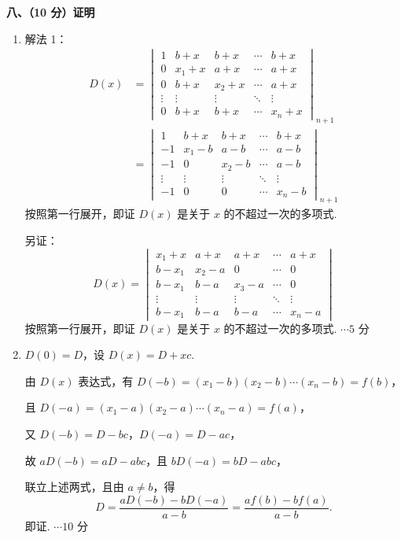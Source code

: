 \documentclass[a4paper,11pt]{ctexart}
\newcommand{\score}[1]{\hfill$\cdots\text{#1 分}$}
\begin{document}
\vspace{1.0em}

\textbf{八、（10 分）证明}

\begin{enumerate}[label=(\arabic*), leftmargin=2.4em, itemsep=0.35em, topsep=0.3em]
  \item 解法 1：
  \begin{align*}
    D(x) &= \begin{vmatrix}
      1 & b+x & b+x & \cdots & b+x \\
      0 & x_1+x & a+x & \cdots & a+x \\
      0 & b+x & x_2+x & \cdots & a+x \\
      \vdots & \vdots & \vdots & \ddots & \vdots \\
      0 & b+x & b+x & \cdots & x_n+x
    \end{vmatrix}_{n+1} \\
    &= \begin{vmatrix}
      1 & b+x & b+x & \cdots & b+x \\
      -1 & x_1-b & a-b & \cdots & a-b \\
      -1 & 0 & x_2-b & \cdots & a-b \\
      \vdots & \vdots & \vdots & \ddots & \vdots \\
      -1 & 0 & 0 & \cdots & x_n-b
    \end{vmatrix}_{n+1}
  \end{align*}
  按照第一行展开，即证 $D(x)$ 是关于 $x$ 的不超过一次的多项式.

  另证：
  \[
    D(x) = \begin{vmatrix}
      x_1+x & a+x & a+x & \cdots & a+x \\
      b-x_1 & x_2-a & 0 & \cdots & 0 \\
      b-x_1 & b-a & x_3-a & \cdots & 0 \\
      \vdots & \vdots & \vdots & \ddots & \vdots \\
      b-x_1 & b-a & b-a & \cdots & x_n-a
    \end{vmatrix}
  \]
  按照第一行展开，即证 $D(x)$ 是关于 $x$ 的不超过一次的多项式. \score{5}

  \item $D(0) = D$，设 $D(x) = D + xc$.

  由 $D(x)$ 表达式，有 $D(-b) = (x_1 - b)(x_2 - b)\cdots(x_n - b) = f(b)$，

  且 $D(-a) = (x_1 - a)(x_2 - a)\cdots(x_n - a) = f(a)$，

  又 $D(-b) = D - bc$，$D(-a) = D - ac$，

  故 $aD(-b) = aD - abc$，且 $bD(-a) = bD - abc$，

  联立上述两式，且由 $a \neq b$，得
  \[
    D = \frac{aD(-b) - bD(-a)}{a - b} = \frac{af(b) - bf(a)}{a - b}.
  \]
  即证. \score{10}
\end{enumerate}
\end{document}

